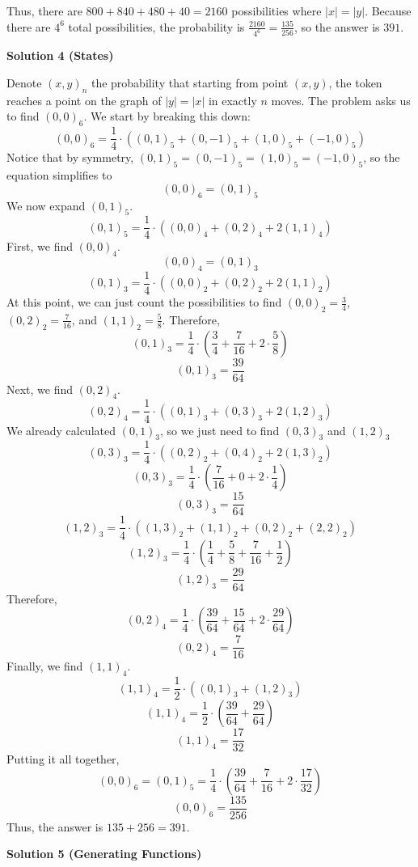 \begin{enumerate}
 Thus, there are $800 + 840 + 480 + 40 = 2160$ possibilities where $|x|=|y|$. Because there are $4^6$ total possibilities, the probability is $\frac{2160}{4^6} = \frac{135}{256}$, so the answer is $\boxed{391}.$




\textbf{Solution 4 (States)}

Denote $(x, y)_n$ the probability that starting from point $(x, y)$, the token reaches a point on the graph of $|y| = |x|$ in exactly $n$ moves. The problem asks us to find $(0, 0)_6$. We start by breaking this down:
 \[(0, 0)_6 = \frac14 \cdot ((0, 1)_5 + (0, -1)_5 + (1, 0)_5 + (-1, 0)_5)\]Notice that by symmetry, $(0, 1)_5 = (0, -1)_5 = (1, 0)_5 = (-1, 0)_5$, so the equation simplifies to
 \[(0, 0)_6 = (0, 1)_5\]We now expand $(0, 1)_5$.
 \[(0, 1)_5 = \frac14 \cdot ((0, 0)_4 + (0, 2)_4 + 2(1, 1)_4)\]First, we find $(0, 0)_4$.
 \[(0, 0)_4 = (0, 1)_3\]
 \[(0, 1)_3 = \frac14 \cdot ((0, 0)_2 + (0, 2)_2 + 2(1, 1)_2)\]At this point, we can just count the possibilities to find $(0, 0)_2 = \frac34$, $(0, 2)_2 = \frac{7}{16}$, and $(1, 1)_2 = \frac58$. Therefore,
 \[(0, 1)_3 = \frac14 \cdot (\frac34 + \frac{7}{16} + 2 \cdot \frac58)\]
 \[(0, 1)_3 = \frac{39}{64}\]Next, we find $(0, 2)_4$.
 \[(0, 2)_4 = \frac14 \cdot ((0, 1)_3 + (0, 3)_3 + 2(1, 2)_3)\]We already calculated $(0, 1)_3$, so we just need to find $(0, 3)_3$ and $(1, 2)_3$
 \[(0, 3)_3 = \frac14 \cdot ((0, 2)_2 + (0, 4)_2 + 2(1, 3)_2)\]
 \[(0, 3)_3 = \frac14 \cdot (\frac{7}{16} + 0 + 2 \cdot \frac{1}{4})\]
 \[(0, 3)_3 = \frac{15}{64}\]
 \[(1, 2)_3 = \frac14 \cdot ((1, 3)_2 + (1, 1)_2 + (0, 2)_2 + (2, 2)_2)\]
 \[(1, 2)_3 = \frac14 \cdot (\frac14 + \frac58 + \frac{7}{16} + \frac12)\]
 \[(1, 2)_3 = \frac{29}{64}\]Therefore,
 \[(0, 2)_4 = \frac14 \cdot (\frac{39}{64} + \frac{15}{64} + 2 \cdot \frac{29}{64})\]
 \[(0, 2)_4 = \frac{7}{16}\]Finally, we find $(1, 1)_4$.
 \[(1, 1)_4 = \frac12 \cdot ((0, 1)_3 + (1, 2)_3)\]
 \[(1, 1)_4 = \frac12 \cdot (\frac{39}{64} + \frac{29}{64})\]
 \[(1, 1)_4 = \frac{17}{32}\]Putting it all together,
 \[(0, 0)_6 = (0, 1)_5 =\frac14 \cdot (\frac{39}{64} + \frac{7}{16} + 2 \cdot \frac{17}{32})\]
 \[(0, 0)_6 = \frac{135}{256}\]Thus, the answer is $135 + 256 = \boxed{391}$.

 



\textbf{Solution 5 (Generating Functions)}


\end{enumerate}

